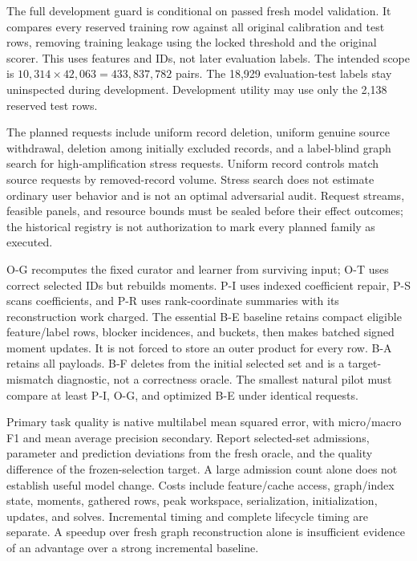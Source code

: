 The full development guard is conditional on passed fresh model
validation. It compares every reserved training row against all original
calibration and test rows, removing training leakage using the locked
threshold and the original scorer. This uses features and IDs, not later
evaluation labels. The intended scope is
$10{,}314\times42{,}063=433{,}837{,}782$ pairs. The 18,929 evaluation-test
labels stay uninspected during development. Development utility may use
only the 2,138 reserved test rows.

The planned requests include uniform record deletion, uniform genuine
source withdrawal, deletion among initially excluded records, and a
label-blind graph search for high-amplification stress requests. Uniform
record controls match source requests by removed-record volume. Stress
search does not estimate ordinary user behavior and is not an optimal
adversarial audit. Request streams, feasible panels, and resource bounds
must be sealed before their effect outcomes; the historical registry is
not authorization to mark every planned family as executed.

O-G recomputes the fixed curator and learner from surviving input; O-T
uses correct selected IDs but rebuilds moments. P-I uses indexed
coefficient repair, P-S scans coefficients, and P-R uses rank-coordinate
summaries with its reconstruction work charged. The essential B-E
baseline retains compact eligible feature/label rows, blocker incidences,
and buckets, then makes batched signed moment updates. It is not forced
to store an outer product for every row. B-A retains all payloads.
B-F deletes from the initial selected set and is a target-mismatch
diagnostic, not a correctness oracle. The smallest natural pilot must
compare at least P-I, O-G, and optimized B-E under identical requests.

Primary task quality is native multilabel mean squared error, with
micro/macro F1 and mean average precision secondary. Report selected-set
admissions, parameter and prediction deviations from the fresh oracle,
and the quality difference of the frozen-selection target. A large
admission count alone does not establish useful model change.
Costs include feature/cache access, graph/index state, moments, gathered
rows, peak workspace, serialization, initialization, updates, and solves.
Incremental timing and complete lifecycle timing are separate. A speedup
over fresh graph reconstruction alone is insufficient evidence of an
advantage over a strong incremental baseline.

